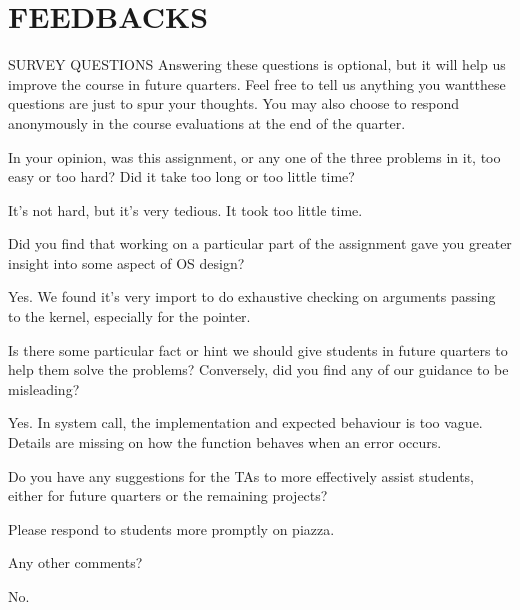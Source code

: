 \section*{FEEDBACKS}
\begin{aspect}{SURVEY QUESTIONS}
	Answering these questions is optional, but it will help us improve the course in future quarters.
	Feel free to tell us anything you wantthese questions are just to spur your thoughts.
	You may also choose to respond anonymously in the course evaluations at the end of the quarter.

	\begin{qc}
		In your opinion,
		was this assignment, or any one of the three problems in it, too easy or too hard?
		Did it take too long or too little time?
	\end{qc}
	It's not hard, but it's very tedious. It took too little time.

	\begin{qc}
		Did you find that working on a particular part of the assignment
		gave you greater insight into some aspect of OS design?
	\end{qc}
	Yes. We found it's very import to do exhaustive checking on arguments passing to the kernel, especially for the pointer.

	\begin{qc}
		Is there some particular fact or hint we should give students in future quarters
		to help them solve the problems?
		Conversely, did you find any of our guidance to be misleading?
	\end{qc}
	Yes. In system call, the implementation and expected behaviour is too vague. Details are missing on how the function behaves when an error occurs.

	\begin{qc}
		Do you have any suggestions for the TAs to more effectively assist students,
		either for future quarters or the remaining projects?
	\end{qc}
Please respond to students more promptly on piazza.
	\begin{qc}
		Any other comments?
	\end{qc}
  No.
\end{aspect}



